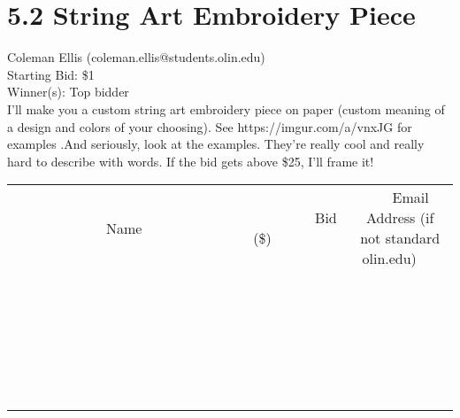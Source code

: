 \documentclass[11pt]{article}
\begin{document}
\section*{5.2 String Art Embroidery Piece}
Coleman Ellis (coleman.ellis@students.olin.edu) \\
Starting Bid: \$1 \\
Winner(s): 
Top bidder \\
I'll make you a custom string art embroidery piece on paper (custom meaning of a design and colors of your choosing). See https://imgur.com/a/vnxJG for examples .And seriously, look at the examples. They're really cool and really hard to describe with words. If the bid gets above \$25, I'll frame it! \\[6ex]
\begin{tabular}{c c c}
~~~~~~~~~~~~~Name~~~~~~~~~~~~~ & ~~~~~~~~~Bid (\$)~~~~~~~~~ & ~~~Email Address (if not standard olin.edu)~~~ \\
 & & \\
\hline
 & & \\
\hline
 & & \\
\hline
 & & \\
\hline
 & & \\
\hline
 & & \\
\hline
 & & \\
\hline
 & & \\
\hline
 & & \\
\hline
 & & \\
\hline
 & & \\
\hline
 & & \\
\hline
 & & \\
\hline
 & & \\
\hline
 & & \\
\hline
 & & \\
\hline
 & & \\
\hline
 & & \\
\hline
 & & \\
\hline
 & & \\
\hline
 & & \\
\hline
 & & \\
\hline
 & & \\
\hline
 & & \\
\hline
 & & \\
\hline
 & & \\
\hline
\end{tabular}
\clearpage
\end{document}
